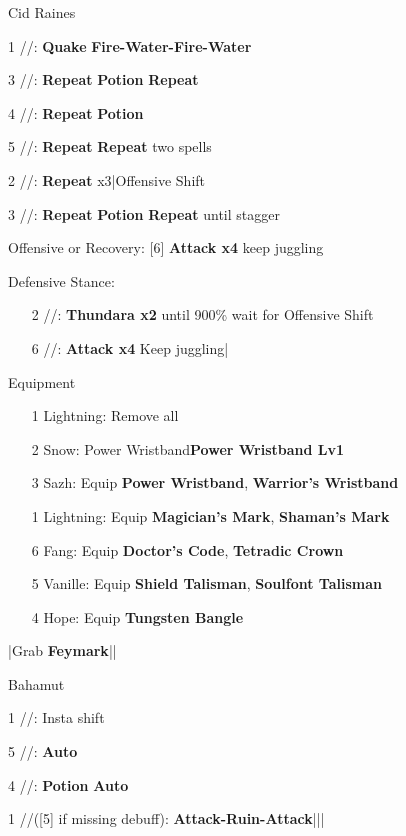 \begin{fight}{Cid Raines}
	\item [1] \rav/\sen/\syn: \textbf{Quake} \to \textbf{Fire-Water-Fire-Water}
	\item [3] \rav/\sen/\rav: \textbf{Repeat} \to \textbf{Potion} \to \textbf{Repeat}
	\item [4] \rav/\sen/\rav: \textbf{Repeat} \to \textbf{Potion}
	\item [5] \rav/\rav/\syn: \textbf{Repeat} \to \textbf{Repeat} two spells
	\item [2] \rav/\rav/\rav: \textbf{Repeat} x3|Offensive Shift
	\item [3] \rav/\sen/\rav: \textbf{Repeat} \to \textbf{Potion} \to \textbf{Repeat} until stagger
	\item Offensive or Recovery: [6] \textbf{Attack x4} \to keep juggling
	\item Defensive Stance:
	\begin{itemize}
		\item [2] \rav/\rav/\rav: \textbf{Thundara x2} until 900\% \to wait for Offensive Shift
		\item [6] \com/\com/\rav: \textbf{Attack x4} \to Keep juggling|\skip
	\end{itemize}
\end{fight}
\begin{menu}
	\item Equipment
	\begin{itemize}
		\item [1] Lightning: Remove all
		\item [2] Snow: Power Wristband\star \to \textbf{Power Wristband Lv1}
		\item [3] Sazh: Equip \textbf{Power Wristband\star}, \textbf{Warrior's Wristband}
		\item [1] Lightning: Equip \textbf{Magician's Mark}, \textbf{Shaman's Mark}
		\item [6] Fang: Equip \textbf{Doctor's Code}, \textbf{Tetradic Crown}
		\item [5] Vanille: Equip \textbf{Shield Talisman}, \textbf{Soulfont Talisman}
		\item [4] Hope: Equip \textbf{Tungsten Bangle}
	\end{itemize}
\end{menu}
\begin{mainlist}
	\item \skip|Grab \textbf{Feymark}|\skip|
\end{mainlist}
\begin{fight}{Bahamut}
	\item [1] \com/\rav/\rav: Insta shift
	\item [5] \sab/\com/\rav: \textbf{Auto}
	\item [4] \sen/\med/\med: \textbf{Potion} \to \textbf{Auto}
	\item [1] \com/\rav/\rav ([5] if missing debuff): \textbf{Attack-Ruin-Attack}|\skip||\save
\end{fight}
